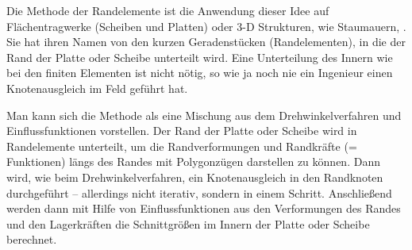 Die  Methode der Randelemente ist die Anwendung dieser Idee auf Fl\"{a}chentragwerke (Scheiben und Platten) oder 3-D Strukturen, wie Staumauern, \cite{Ha3}. Sie hat ihren Namen von den kurzen Geradenst\"{u}cken (Randelementen), in die der Rand der Platte oder Scheibe unterteilt wird. Eine Unterteilung des Innern wie bei den finiten Elementen ist nicht n\"{o}tig, so wie ja noch nie ein Ingenieur einen Knotenausgleich \glq im Feld\grq{} gef\"{u}hrt hat.

Man kann sich die Methode als eine Mischung aus dem Drehwinkelverfahren und Einflussfunktionen vorstellen. Der Rand der Platte oder Scheibe wird in Randelemente unterteilt,  um die Randverformungen und Randkr\"{a}fte (= Funktionen) l\"{a}ngs des Randes mit Polygonz\"{u}gen darstellen zu k\"{o}nnen. Dann wird, wie beim Drehwinkelverfahren, ein Knotenausgleich in den Randknoten durchgef\"{u}hrt -- allerdings nicht iterativ, sondern in einem Schritt. Anschlie{\ss}end werden dann mit Hilfe von Einflussfunktionen aus den Verformungen des Randes und den Lagerkr\"{a}ften die Schnittgr\"{o}{\ss}en im Innern der Platte oder Scheibe berechnet.\\

